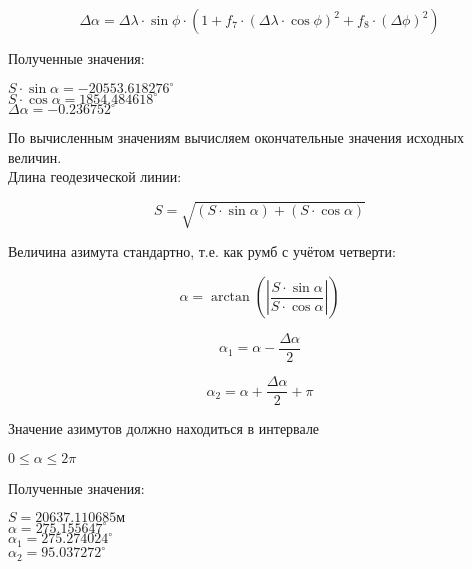 \documentclass[a4paper,14pt]{article}
\newcommand\indent[1][1cm]{\hspace*{#1}}
\begin{document}
\begin{equation}
    \Delta\alpha =  \Delta\lambda \cdot \sin{\phi} \cdot \left(1 + f_7 \cdot (\Delta\lambda \cdot \cos{\phi})^2 + f_8 \cdot (\Delta\phi)^2 \right)
\end{equation}

\indent Полученные значения:

\begin{center}
    $S \cdot \sin{\alpha} = -20553.618276^\circ$\\
    $S \cdot \cos{\alpha} = 1854.484618^\circ$\\
    $\Delta\alpha = -0.236752^\circ$\\
\end{center}

\indent По вычисленным значениям вычисляем окончательные значения исходных величин.\\
\indent Длина геодезической линии:

\begin{equation}
    S = \sqrt{\left(S \cdot \sin{\alpha} \right) + \left(S \cdot \cos{\alpha} \right)}
\end{equation}

\indent Величина азимута стандартно, т.е. как румб с учётом четверти:

\begin{equation}
    \alpha = \arctan\left (\left|\frac{S \cdot \sin{\alpha}}{S \cdot \cos{\alpha}} \right| \right)
\end{equation}

\begin{equation}
    \alpha_1 = \alpha - \frac{\Delta\alpha}{2}
\end{equation}

\begin{equation}
    \alpha_2 = \alpha + \frac{\Delta\alpha}{2} + \pi
\end{equation}

\indent Значение азимутов должно находиться в интервале

\begin{center}
    $0 \leqslant \alpha \leqslant 2 \pi$
\end{center}

\indent Полученные значения:
\begin{center}
    $S = 20637.110685 \textit{м}$\\
    $\alpha = 275.155647^\circ$\\
    $\alpha_1 = 275.274024^\circ$\\
    $\alpha_2 = 95.037272^\circ$\\
\end{center}
\end{document}
